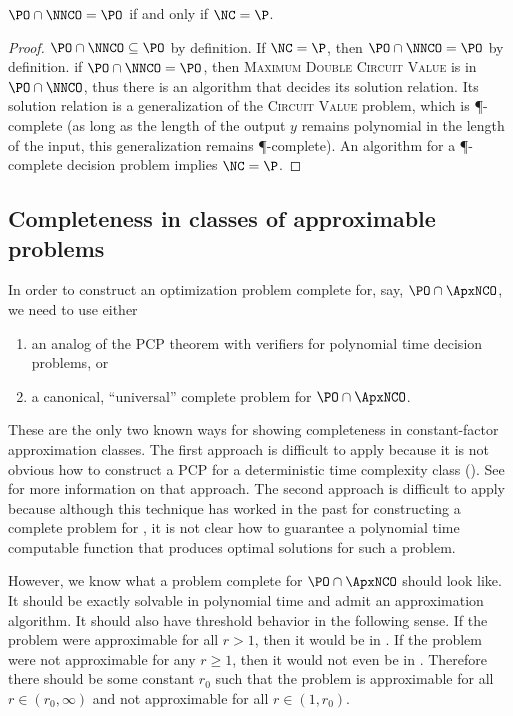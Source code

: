 \documentclass[]{article}
\begin{document}
\begin{theorem}\label{thm:poppo}
  $\PO \cap \NNCO = \PO$ if and only if $\NC = \P$.
\end{theorem}
\begin{proof}
  $\PO \cap \NNCO \subseteq \PO$ by definition.
  If $\NC = \P$, then $\PO \cap \NNCO = \PO$ by definition.
  if $\PO \cap \NNCO = \PO$, then \textsc{Maximum Double Circuit Value} is in $\PO \cap \NNCO$, thus there is an \NC{} algorithm that decides its solution relation.
  Its solution relation is a generalization of the \textsc{Circuit Value} problem, which is \P-complete (as long as the length of the output $y$ remains polynomial in the length of the input, this generalization remains \P-complete).
  An \NC{} algorithm for a \P-complete decision problem implies $\NC = \P$.
\end{proof}

\subsection{Completeness in classes of approximable problems}

In order to construct an optimization problem complete for, say, $\PO \cap \ApxNCO$, we need to use either
\begin{enumerate}
\item an analog of the PCP theorem with \NC{} verifiers for polynomial time decision problems, or
\item a canonical, ``universal'' complete problem for $\PO \cap \ApxNCO$.
\end{enumerate}
These are the only two known ways for showing completeness in constant-factor approximation classes.
The first approach is difficult to apply because it is not obvious how to construct a PCP for a deterministic time complexity class (\PO).
See \cite{finkelstein13} for more information on that approach.
The second approach is difficult to apply because although this technique has worked in the past for constructing a complete problem for \ApxPO{} \cite[Lemma~2]{cp91}, it is not clear how to guarantee a polynomial time computable function that produces optimal solutions for such a problem.

However, we know what a problem complete for $\PO \cap \ApxNCO$ should look like.
It should be exactly solvable in polynomial time and admit an \NC{} approximation algorithm.
It should also have threshold behavior in the following sense.
If the problem were approximable for all $r > 1$, then it would be in \NCAS.
If the problem were not approximable for any $r \geq 1$, then it would not even be in \ApxNCO.
Therefore there should be some constant $r_0$ such that the problem is approximable for all $r \in (r_0, \infty)$ and not approximable for all $r \in (1, r_0)$.
\end{document}
